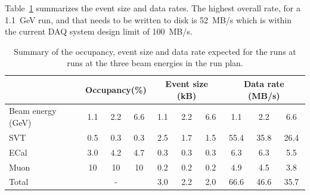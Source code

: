 Table~\ref{tab:data_rates} summarizes the event size and data rates. The highest overall rate, for a 1.1~GeV run, and that needs to be written to disk is 52~MB/s which is within the current 
DAQ system design limit of 100~MB/s. 
\begin{table}[]
\centering
\begin{tabular}{|l|ccc|ccc|ccc|}
\hline
 & \multicolumn{3}{|c|}{Occupancy(\%)} &  \multicolumn{3}{|c|}{Event size (kB)} &  \multicolumn{3}{|c|}{Data rate (MB/s)} \\
\hline
Beam energy (GeV) & 1.1 & 2.2 & 6.6 & 1.1 & 2.2 & 6.6 & 1.1 & 2.2 & 6.6 \\
\hline
SVT & 0.5 & 0.3  & 0.3  & 2.5 & 1.7 & 1.5 & 55.4 & 35.8 & 26.4\\
ECal & 3.0 & 4.2  & 4.7 & 0.3 & 0.3  & 0.3 & 6.3 & 6.3  & 5.5 \\
Muon & 10 &  10 & 10  & 0.2 & 0.2 & 0.2 & 4.9 & 4.5 & 3.8 \\
\hline
Total& \multicolumn{3}{|c|}{-} & 3.0 & 2.2 & 2.0 & 66.6 & 46.6 & 35.7 \\
\hline
\end{tabular}
\caption{{\small Summary of the occupancy, event size and data rate expected for the runs at  runs at the three beam 
energies in the run plan. }}
\label{tab:data_rates}
\end{table}
